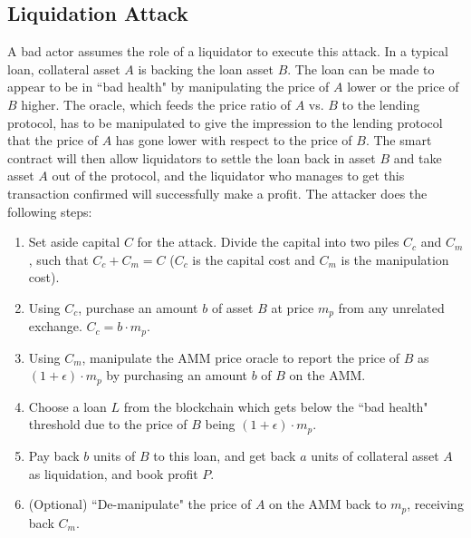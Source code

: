 \documentclass[conference]{IEEEtran}
\begin{document}
\subsection{Liquidation Attack}
A bad actor assumes the role of a liquidator to execute this attack. In a typical loan, collateral asset $A$ is backing the loan asset $B$. The loan can be made to appear to be in ``bad health" by manipulating the price of $A$ lower or the price of $B$ higher. The oracle, which feeds the price ratio of $A$ vs. $B$ to the lending protocol, has to be manipulated to give the impression to the lending protocol that the price of $A$ has gone lower with respect to the price of $B$. The smart contract will then allow liquidators to settle the loan back in asset $B$ and take asset $A$ out of the protocol, and the liquidator who manages to get this transaction confirmed will successfully make a profit. The attacker does the following steps:
\begin{enumerate}
    \item Set aside capital $C$ for the attack. Divide the capital into two piles $C_c$ and $C_m$, such that $C_c + C_m = C$ ($C_c$ is the capital cost and $C_m$ is the manipulation cost). 
    \item \label{step_buy_asset_liq} Using $C_c$, purchase an amount $b$ of asset $B$ at price $m_p$ from any unrelated exchange. $C_c = b \cdot m_p$.
    \item \label{step_manipulate_liq} Using $C_m$, manipulate the AMM price oracle to report the price of $B$ as $(1 + \epsilon) \cdot m_p$ by purchasing an amount $b$ of $B$ on the AMM.
    \item Choose a loan $L$ from the blockchain which gets below the ``bad health" threshold due to the price of $B$ being $(1 + \epsilon) \cdot m_p$. 
    \item Pay back $b$ units of $B$ to this loan, and get back $a$ units of collateral asset $A$ as liquidation, and book profit $P$.
    \item \label{step_de_manipulate_liq} (Optional) ``De-manipulate" the price of $A$ on the AMM back to $m_p$, receiving back $C_m$.
\end{enumerate}
\end{document}
